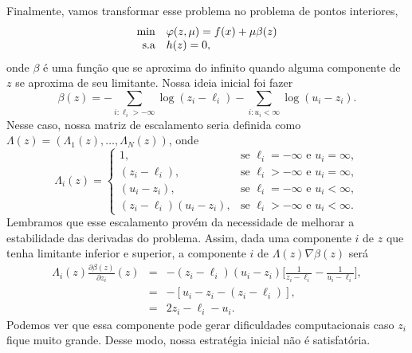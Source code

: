 Finalmente, vamos transformar esse problema no problema de pontos interiores,
\begin{equation}\visiblelbl{prob:geral_pto_int}
 \begin{array}{rl}
  \min & \varphi(z,\mu) = f(x) + \mu \beta(z)\\
  \mbox{s.a} & h(z) = 0,
 \end{array}
\end{equation}
onde $\beta$ é uma função que se aproxima do infinito quando alguma componente
de $z$ se aproxima de seu limitante. Nossa ideia inicial foi fazer
$$\beta(z) = -\sum_{i : \ell_i>-\infty}\log(z_i - \ell_i) -
\sum_{i:u_i<\infty}\log(u_i-z_i).$$
Nesse caso, nossa matriz de escalamento seria definida como
$\Lambda(z) = (\Lambda_1(z),\dots,\Lambda_N(z))$, onde
\begin{equation}
\Lambda_i(z) = \left\{
 \begin{array}{ll}
  1,                      & \mbox{se } \ell_i = -\infty \mbox{ e } u_i = \infty, \\
  (z_i - \ell_i),            & \mbox{se } \ell_i > -\infty \mbox{ e } u_i =
   \infty, \\
  (u_i - z_i),            & \mbox{se } \ell_i = -\infty \mbox{ e } u_i < \infty, \\
  (z_i - \ell_i)(u_i - z_i), & \mbox{se } \ell_i > -\infty \mbox{ e } u_i <
   \infty.
 \end{array}\right.
\end{equation}
Lembramos que esse escalamento provém da necessidade de melhorar a estabilidade
das derivadas do problema. Assim, dada uma componente $i$ de $z$ que tenha
limitante inferior e superior, a componente $i$ de $\Lambda(z) \nabla \beta(z)$
será
\begin{eqnarray*}
 \Lambda_i(z) \frac{\partial \beta(z)}{\partial z_i}(z) & = &
- (z_i - \ell_i)(u_i - z_i) \bigg[\frac{1}{z_i - \ell_i} - \frac{1}{u_i -
    \ell_i}\bigg], \\
& = & - [u_i - z_i - (z_i - \ell_i)], \\
& = & 2z_i - \ell_i - u_i.
\end{eqnarray*}
Podemos ver que essa componente pode gerar dificuldades computacionais caso
$z_i$ fique muito grande. Desse modo, nossa estratégia inicial não é
satisfatória.

